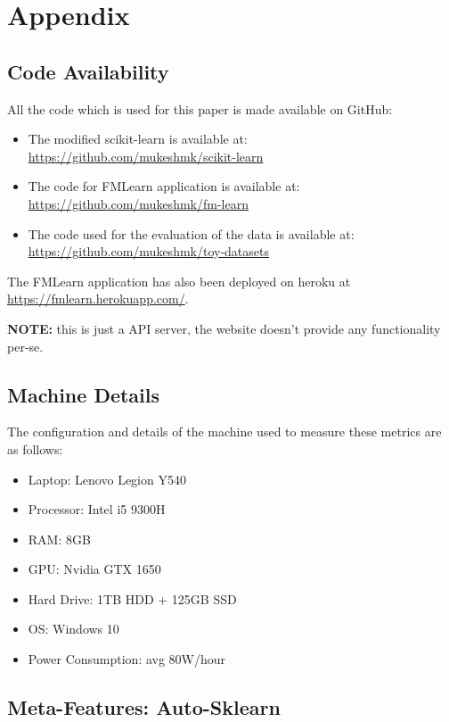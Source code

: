 \chapter{Appendix}
\section{Code Availability}
All the code which is used for this paper is made available on GitHub:
\begin{itemize}
    \item The modified scikit-learn is available at: \newline \href{https://github.com/mukeshmk/scikit-learn}{https://github.com/mukeshmk/scikit-learn}
    \item The code for FMLearn application is available at: \newline \href{https://github.com/mukeshmk/fm-learn}{https://github.com/mukeshmk/fm-learn}
    \item The code used for the evaluation of the data is available at: \newline \href{https://github.com/mukeshmk/toy-datasets}{https://github.com/mukeshmk/toy-datasets}
\end{itemize}
The FMLearn application has also been deployed on heroku at \href{https://fmlearn.herokuapp.com/}{https://fmlearn.herokuapp.com/}. 

\textbf{NOTE:} this is just a API server, the website doesn't provide any functionality per-se.

\section{Machine Details}
\label{machine-details}
The configuration and details of the machine used to measure these metrics are as follows:

\begin{itemize}
    \item Laptop: Lenovo Legion Y540
    \item Processor: Intel i5 9300H
    \item RAM: 8GB
    \item GPU: Nvidia GTX 1650
    \item Hard Drive: 1TB HDD + 125GB SSD
    \item OS: Windows 10
    \item Power Consumption: avg 80W/hour
\end{itemize}

\newpage
\section{Meta-Features: Auto-Sklearn}
\label{meta-features-ask}


